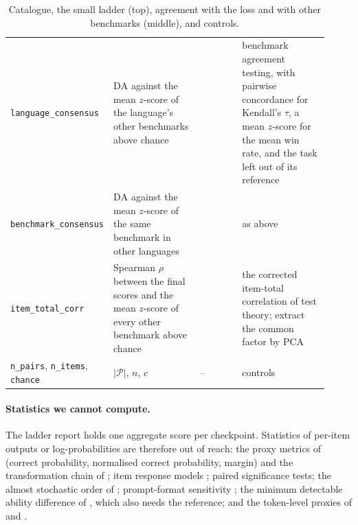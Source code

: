 \begin{table}[h]
\begin{tabular}{@{}p{0.215\linewidth}p{0.28\linewidth}p{0.14\linewidth}p{0.285\linewidth}@{}}
\texttt{language\_consensus} & $\mathrm{DA}$ against the mean $z$-score of the language's other benchmarks above chance & \citet{perlitz_benchbench_2024} & benchmark agreement testing, with pairwise concordance for Kendall's $\tau$, a mean $z$-score for the mean win rate, and the task left out of its reference \\
\texttt{benchmark\_consensus} & $\mathrm{DA}$ against the mean $z$-score of the same benchmark in other languages & \citet{perlitz_benchbench_2024} & as above \\
\texttt{item\_total\_corr} & Spearman $\rho$ between the final scores and the mean $z$-score of every other benchmark above chance & \citet{ruan_observational_2024, cronbach_coefficient_1951} & the corrected item-total correlation of test theory; \citet{ruan_observational_2024} extract the common factor by PCA \\
\midrule
\texttt{n\_pairs}, \texttt{n\_items}, \texttt{chance} & $|\mathcal{P}|$, $n$, $c$ & -- & controls \\
\bottomrule
\end{tabular}
\caption{Catalogue, the small ladder (top), agreement with the loss and with other benchmarks (middle), and controls.}
\label{tab:sur-agreement}
\end{table}

\paragraph{Statistics we cannot compute.}
The ladder report holds one aggregate score per checkpoint.
Statistics of per-item outputs or log-probabilities are therefore out of reach: the proxy metrics of \citet{magnusson_datadecide_2025} (correct probability, normalised correct probability, margin) and the transformation chain of \citet{schaeffer_why_2024}; item response models \citep{polo_tinybenchmarks_2024, kipnis_metabench_2025}; paired significance tests; the almost stochastic order of \citet{dror_deep_2019}; prompt-format sensitivity \citep{alzahrani_when_2024}; the minimum detectable ability difference of \citet{yauney_reliable_2026}, which also needs the reference; and the token-level proxies of \citet{patel_forecasting_2026} and \citet{koh_predicting_2026}.

